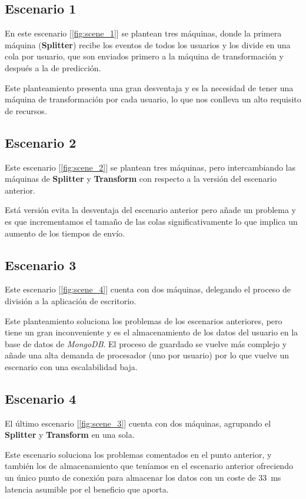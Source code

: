 \subsection{Escenario 1}

En este escenario [\cref{fig:scene_1}] se plantean tres máquinas, donde la primera máquina (\textbf{Splitter}) recibe los eventos de todos los usuarios y los divide en una cola por usuario, que son enviados primero a la máquina de transformación y después a la de predicción.



Este planteamiento presenta una gran desventaja y es la necesidad de tener una máquina de transformación por cada usuario, lo que nos conlleva un alto requisito de recursos.

\subsection{Escenario 2}

Este escenario [\cref{fig:scene_2}] se plantean tres máquinas, pero intercambiando las máquinas de \textbf{Splitter} y \textbf{Transform} con respecto a la versión del escenario anterior.



Está versión evita la desventaja del escenario anterior pero añade un problema y es que incrementamos el tamaño de las colas significativamente lo que implica un aumento de los tiempos de envío.

\subsection{Escenario 3}

Este escenario [\cref{fig:scene_4}] cuenta con dos máquinas, delegando el proceso de división a la aplicación de escritorio.

Este planteamiento soluciona los problemas de los escenarios anteriores, pero tiene un gran inconveniente y es el almacenamiento de los datos del usuario en la base de datos de \textit{MongoDB}. El proceso de guardado se vuelve más complejo y añade una alta demanda de procesador (uno por usuario) por lo que vuelve un escenario con una escalabilidad baja.

\subsection{Escenario 4}

El último escenario  [\cref{fig:scene_3}] cuenta con dos máquinas, agrupando el \textbf{Splitter} y \textbf{Transform} en una sola.


Este escenario soluciona los problemas comentados en el punto anterior, y también los de almacenamiento que teníamos en el escenario anterior ofreciendo un único punto de conexión para almacenar los datos con un coste de 33~ms latencia asumible por el beneficio que aporta.
